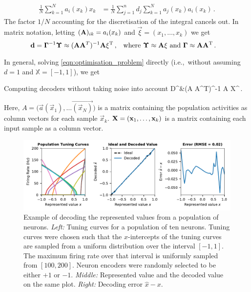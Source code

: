 \documentclass[10pt,letterpaper,oneside]{article}
\begin{document}
\begin{align*}
	\frac{1}N \sum_{k = 1}^N a_i(x_k) x_k
		&= \frac{1}N \sum_{j = 1}^n d_j \sum_{k = 1}^N a_j(x_k) a_i(x_k) \,.
\end{align*}
The factor $1/N$ accounting for the discretisation of the integral cancels out. In matrix notation, letting $({\mathbf{A}})_{ik} = a_i(x_k)$ and $\vec \xi = (x_1, \ldots, x_k)$ we get
\begin{align*}
	{\mathbf{d}} &={\mathbf{\Gamma}}^{-1} {\mathbf{\Upsilon}} \approx  ({\mathbf{A}} {\mathbf{A}}^T)^{-1} {\mathbf{A}} {\mathbf{\xi}}^{\mathrm{T}} \,, &&
	\text{where } {\mathbf{\Upsilon}} \approx {\mathbf{A}} {\mathbf{\xi}} \text{ and } {\mathbf{\Gamma}} \approx {\mathbf{A}} {\mathbf{A}}^{\mathrm{T}} \,.
\end{align*}

In general, solving \cref{eqn:optimisation_problem} directly (i.e.,~without assuming $d = 1$ and $\mathbb{X} = [-1, 1]$), we get
\begin{ImportantEqn}{Computing decoders without taking noise into account}
	\mat D^\T &\approx  (\mat A \mat A^T)^{-1} \mat A \mat X^\T \,.
	\label{eqn:decoders}
\end{ImportantEqn}
Here, $A = \big(\vec a(\vec x_1), \ldots \vec{(\vec x_N)}\big)$ is a matrix containing the population activities as column vectors for each sample ${\vec x}_k$. ${\mathbf{X}} = ({{\mathbf{x}}}_1, \ldots, {{\mathbf{x}}}_k)$ is a matrix containing each input sample as a column vector.

\begin{figure}
	\centering
	\includegraphics{media/decoding_example_no_noise.pdf}
	\caption{Example of decoding the represented values from a population of neurons. \emph{Left:} Tuning curves for a population of ten neurons. Tuning curves were chosen such that the $x$-intercepts of the tuning curves are sampled from a uniform distribution over the interval $[-1, 1]$. The maximum firing rate over that interval is uniformly sampled from $[100, 200]$. Neuron encoders were randomly selected to be either $+1$ or $-1$. \emph{Middle:} Represented value and the decoded value on the same plot. \emph{Right:} Decoding error $\hat x - x$. }
	\label{fig:decoding_example_no_noise}
\end{figure}
\end{document}
